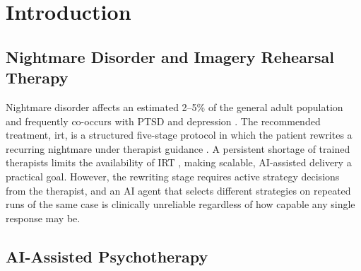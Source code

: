 \chapter{Introduction}
\label{chap:introduction}

\section{Nightmare Disorder and Imagery Rehearsal Therapy}
\label{sec:intro-irt}

Nightmare disorder affects an estimated 2--5\% of the general adult population \parencite{YPHMANIU,HM68TTLK,Q24CN9LD} and frequently co-occurs with PTSD and depression \autocite{34M7Y3F8}.
The recommended treatment, \gls{irt}, is a structured five-stage protocol in which the patient rewrites a recurring nightmare under therapist guidance \autocite{FGA5H3ZD}.
A persistent shortage of trained therapists limits the availability of IRT \autocite{7M7NHYXT}, making scalable, AI-assisted delivery a practical goal.
However, the rewriting stage requires active strategy decisions from the therapist, and an AI agent that selects different strategies on repeated runs of the same case is clinically unreliable regardless of how capable any single response may be.


\section{AI-Assisted Psychotherapy}
\label{sec:intro-ai-therapy}

